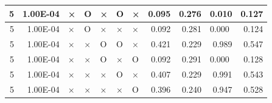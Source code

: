 \documentclass[11pt]{article}
\begin{document}
\begin{longtable}[h]{|r|r|l|l|l|l|l|r|r|l|r|}
5                                 & 1.00E-04                         & ×                                & O                                & ×                                & O                                & ×                                 & 0.095                             & 0.276                             & \multicolumn{1}{r|}{0.010}         & 0.127                               \\ \hline
5                                 & 1.00E-04                         & ×                                & O                                & ×                                & ×                                & ×                                 & 0.092                             & 0.281                             & 0.000                              & 0.124                               \\ \hline
5                                 & 1.00E-04                         & ×                                & ×                                & O                                & O                                & ×                                 & 0.421                             & 0.229                             & \multicolumn{1}{r|}{0.989}         & 0.547                               \\ \hline
5                                 & 1.00E-04                         & ×                                & ×                                & O                                & ×                                & O                                 & 0.092                             & 0.291                             & 0.000                              & 0.128                               \\ \hline
5                                 & 1.00E-04                         & ×                                & ×                                & ×                                & O                                & ×                                 & 0.407                             & 0.229                             & \multicolumn{1}{r|}{0.991}         & 0.543                               \\ \hline
5                                 & 1.00E-04                         & ×                                & ×                                & ×                                & ×                                & O                                 & 0.396                             & 0.240                             & \multicolumn{1}{r|}{0.947}         & 0.528                               \\ \hline

\end{longtable}
\end{document}
